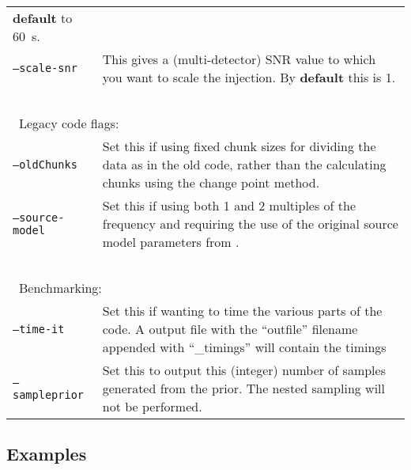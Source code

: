 \begin{footnotesize}
\begin{longtable}{|p{}p{}|}
                            {\bf default} to 60~s. \\
 {\tt --scale-snr}       &  This gives a (multi-detector) SNR value to which you want to scale the injection. By {\bf default} this is 1. \\
 ~ & ~ \\
\multicolumn{2}{|l|}{~Legacy code flags:} \\
 {\tt --oldChunks}       &  Set this if using fixed chunk sizes for dividing the data as in the old code, rather than the
                            calculating chunks using the change point method. \\
 {\tt --source-model}    &  Set this if using both 1 and 2 multiples of the frequency and requiring the use of the original source
                            model parameters from \citet{2015MNRAS.453.4399P}. \\
 ~ & ~ \\
\multicolumn{2}{|l|}{~Benchmarking:} \\
 {\tt --time-it}         &  Set this if wanting to time the various parts of the code. A output file with the ``outfile'' filename
                            appended with ``\_timings'' will contain the timings \\
 {\tt --sampleprior}     &  Set this to output this (integer) number of samples generated from the prior. The nested sampling will not
                            be performed. \\
\hline
\end{longtable}
\end{footnotesize}

\subsection{Examples}\label{app:examples}

